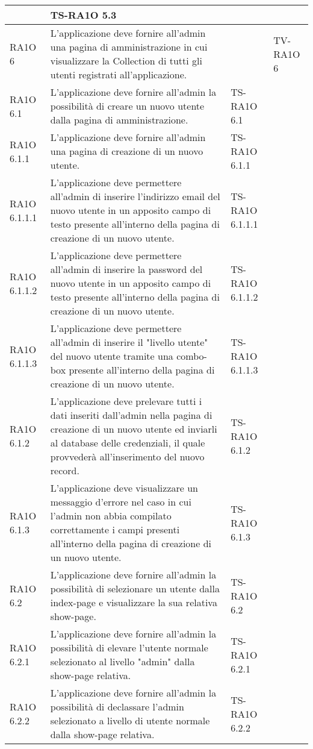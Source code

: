 \begin{center}
\begin{longtable}{| p{2cm} | p{6cm} | p{2.5cm} | p{2.5cm} | }
 & TS-RA1O 5.3 & \\ \hline 
				RA1O 6 & 
				L'applicazione deve fornire all'admin una pagina di amministrazione in cui visualizzare la Collection di tutti gli utenti registrati all'applicazione. &  & TV-RA1O 6 \\ \hline 
				RA1O 6.1 & 
				L'applicazione deve fornire all'admin la possibilità  di creare un nuovo utente dalla pagina di amministrazione. & TS-RA1O 6.1 & \\ \hline 
				RA1O 6.1.1 & 
				L'applicazione deve fornire all'admin una pagina di creazione di un nuovo utente. & TS-RA1O 6.1.1 & \\ \hline 
				RA1O 6.1.1.1 & 
				L'applicazione deve permettere all'admin di inserire l'indirizzo email del nuovo utente in un apposito campo di testo presente all'interno della pagina di creazione di un nuovo utente.
 & TS-RA1O 6.1.1.1 & \\ \hline 
				RA1O 6.1.1.2 & 
				L'applicazione deve permettere all'admin di inserire la password del nuovo utente in un apposito campo di testo presente all'interno della pagina di creazione di un nuovo utente. & TS-RA1O 6.1.1.2 & \\ \hline 
				RA1O 6.1.1.3 & 
				L'applicazione deve permettere all'admin di inserire il "livello utente" del nuovo utente tramite una combo-box presente all'interno della pagina di creazione di un nuovo utente. & TS-RA1O 6.1.1.3 & \\ \hline 
				RA1O 6.1.2 & 
				L'applicazione deve prelevare tutti i dati inseriti dall'admin nella pagina di creazione di un nuovo utente ed inviarli al database delle credenziali, il quale provvederà  all'inserimento del nuovo record. & TS-RA1O 6.1.2 & \\ \hline 
				RA1O 6.1.3 & 
				L'applicazione deve visualizzare un messaggio d'errore nel caso in cui l'admin non abbia compilato correttamente i campi presenti all'interno della pagina di creazione di un nuovo utente. & TS-RA1O 6.1.3 & \\ \hline 
				RA1O 6.2 & 
				L'applicazione deve fornire all'admin la possibilità di selezionare un utente dalla index-page e visualizzare la sua relativa show-page. & TS-RA1O 6.2 & \\ \hline 
				RA1O 6.2.1 & 
				L'applicazione deve fornire all'admin la possibilità di elevare l'utente normale selezionato al livello "admin" dalla show-page relativa. & TS-RA1O 6.2.1 & \\ \hline 
				RA1O 6.2.2 & 
				L'applicazione deve fornire all'admin la possibilità di declassare l'admin selezionato a livello di utente normale dalla show-page relativa. & TS-RA1O 6.2.2 & \\ \hline 

\end{longtable}
\end{center}
